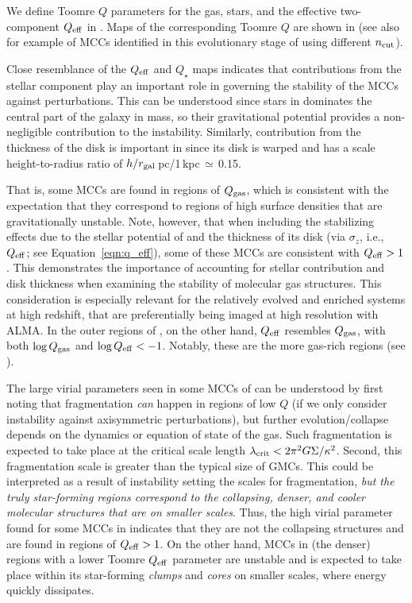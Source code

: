\IfFileExists{emulateapjlegacy.cls}{\documentclass[iop]{emulateapjlegacy}}{\documentclass[iop]{emulateapj}}
\begin{document}
We define Toomre $Q$ parameters for the gas, stars, and the effective two-component $Q_{\rm eff}$ in . Maps of the corresponding Toomre $Q$ are shown in  (see also  for example of MCCs identified in this evolutionary stage of \flower using different $n_{\rm cut}$).

Close resemblance of the $Q_{\rm eff}$ and $Q_{\star}$ maps indicates that contributions from the stellar component play an important role in governing the stability of the MCCs against perturbations. This can be understood since stars in \flower dominates the central part of the galaxy in mass, so their gravitational potential provides a non-negligible contribution to the instability. Similarly, contribution from the thickness of the disk is important in \flower since its disk is warped and has a scale height-to-radius ratio of $h/r_{\rm gal}$\,pc/1\,kpc\,$\simeq$\,0.15.

That is, some MCCs are found in regions of $Q_{\rm gas}$, which is consistent with the expectation that they correspond to regions of high surface densities that are gravitationally unstable. Note, however, that when including the stabilizing effects due to the stellar potential of \flower and the thickness of its disk (via $\sigma_z$, i.e., $Q_{\rm eff}$; see Equation~\ref{eqn:q_eff}), some of these MCCs are consistent with $Q_{\rm eff} > 1$.
%
This demonstrates the importance of accounting for stellar contribution and disk thickness when examining the stability of molecular gas structures. This consideration is especially relevant for the relatively evolved and enriched systems at high redshift, that are preferentially being imaged at high resolution with ALMA. In the outer regions of \flower, on the other hand, $Q_{\rm eff}$ resembles $Q_{\rm gas}$, with both $\log{Q_{\rm gas}}$ and $\log{Q_{\rm eff}} < -1$. Notably, these are the more gas-rich regions (see ).

The large virial parameters seen in some MCCs of \flower can be understood by first noting that fragmentation {\em can} happen in regions of low $Q$ (if we only consider instability against axisymmetric perturbations), but further evolution/collapse depends on the dynamics or equation of state of the gas.
%
Such fragmentation is expected to take place at the critical scale length $\lambda_{\rm crit} < 2 \pi^2 G \Sigma / \kappa^2$. Second, this fragmentation scale is greater than the typical size of GMCs.
%
This could be interpreted as a result of instability setting the scales for fragmentation, {\em but the truly star-forming regions correspond to the collapsing, denser, and cooler molecular structures that are on smaller scales}.
%
Thus, the high virial parameter found for some MCCs in \flower indicates that they are not the collapsing structures and are found in regions of $Q_{\rm eff}>1$. On the other hand, MCCs in (the denser) regions with a lower Toomre $Q_{\rm eff}$ parameter are unstable and \SF is expected to take place within its star-forming {\it clumps} and {\it cores} on smaller scales, where energy quickly dissipates.
\end{document}
